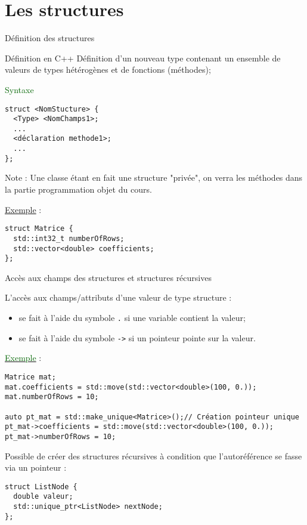 \documentclass[compress,10pt,aspectratio=169]{beamer}
\begin{document}
\section{Les structures}

\begin{frame}[fragile]{Définition des structures}
\scriptsize
  
\begin{block}{\scriptsize Définition en C++}
Définition d'un nouveau type contenant un ensemble de valeurs de types hétérogènes et de fonctions (\alert{méthodes});
\end{block}
  
\textcolor{DarkGreen}{\scriptsize Syntaxe}
\begin{verbatim}
struct <NomStucture> {
  <Type> <NomChamps1>;
  ...
  <déclaration methode1>;
  ...
};
\end{verbatim}

\alert{Note} : Une classe étant en fait une structure "privée", on verra les méthodes dans la partie programmation objet du cours.
  
\underline{Exemple} :
\begin{verbatim}
struct Matrice {
  std::int32_t numberOfRows;
  std::vector<double> coefficients;
};
\end{verbatim}
\end{frame}

\begin{frame}[fragile]{Accès aux champs des structures et structures récursives}
\scriptsize
  
L'accès aux champs/attributs d'une valeur de type structure :
\begin{itemize}
\item se fait à l'aide du symbole \texttt{.} si une variable contient la valeur;
\item se fait à l'aide du symbole \texttt{->} si un pointeur pointe sur la valeur.
\end{itemize}

\underline{\textcolor{DarkGreen}{Exemple}} :
\begin{verbatim}
Matrice mat;
mat.coefficients = std::move(std::vector<double>(100, 0.));
mat.numberOfRows = 10;

auto pt_mat = std::make_unique<Matrice>();// Création pointeur unique
pt_mat->coefficients = std::move(std::vector<double>(100, 0.));
pt_mat->numberOfRows = 10;
\end{verbatim}
  
Possible de créer des structures récursives à condition que l'autoréférence se fasse via un pointeur :
\begin{verbatim}
struct ListNode {
  double valeur;
  std::unique_ptr<ListNode> nextNode;
};
\end{verbatim}
\end{frame}  
\end{document}
